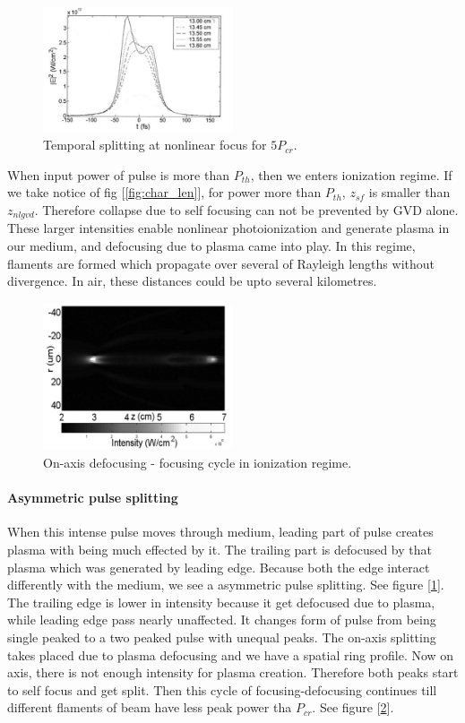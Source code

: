 \documentclass[../main.tex]{subfiles}
\begin{document}
	\begin{figure} [h]
		\includegraphics[width=0.5\textwidth]{images/split_ion.png}
		\caption{Temporal splitting at nonlinear focus for $5P_{cr}$.
		\label{fig:split_ion}}
	\end{figure}
	When input power of pulse is more than $P_{th}$, then we enters ionization
	regime. If we take notice of fig [\ref{fig:char_len}], for power more
	than $P_{th}$, $z_{sf}$ is smaller than $z_{nlgvd}$. Therefore collapse
	due to self focusing can not be prevented by GVD alone.
	These larger intensities enable nonlinear photoionization and
	generate plasma in our medium, and defocusing due to plasma came into
	play.
	In this regime, flaments are formed which propagate over several of
	Rayleigh lengths without divergence. In air, these distances could be
	upto several kilometres.

	\begin{figure} [h]
		\includegraphics[width=0.5\textwidth]{images/filament1.png}
		\caption{On-axis defocusing - focusing cycle in ionization
			regime.
		\label{fig:fila_ion}}
	\end{figure}


	\paragraph{\textbf{Asymmetric pulse splitting}}
	When this intense pulse moves through medium, leading part of pulse
	creates plasma with being much effected by it. The trailing part is
	defocused by that plasma which was generated by leading edge. Because
	both the edge interact differently with the medium, we see a asymmetric
	pulse splitting. See figure [\ref{fig:split_ion}].
	The trailing edge is lower in intensity because it get defocused due to
	plasma, while leading edge pass nearly unaffected. It changes form of
	pulse from being single peaked to a two peaked pulse with unequal peaks.
	The on-axis splitting takes placed due to plasma defocusing and we have
	a spatial ring profile. Now on axis, there is not enough intensity for
	plasma creation. Therefore both peaks start to self focus and get split.
	Then this cycle of focusing-defocusing continues till different flaments
	of beam have less peak power tha $P_{cr}$. See figure
	[\ref{fig:fila_ion}].
\end{document}
